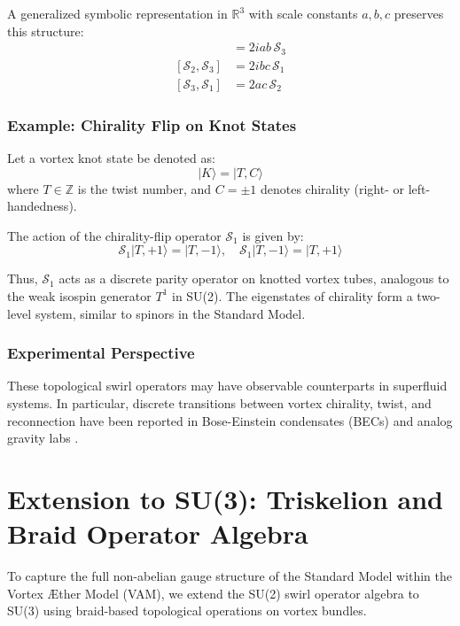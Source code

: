 A generalized symbolic representation in $\mathbb{R}^3$ with scale constants $a, b, c$ preserves this structure:
\begin{align}
[\mathcal{S}_1, \mathcal{S}_2] &= 2iab \, \mathcal{S}_3 \\
[\mathcal{S}_2, \mathcal{S}_3] &= 2ibc \, \mathcal{S}_1 \\
[\mathcal{S}_3, \mathcal{S}_1] &= 2ac \, \mathcal{S}_2
\end{align}

\subsubsection*{Example: Chirality Flip on Knot States}

Let a vortex knot state be denoted as:
\[
|K\rangle = |T, C\rangle
\]
where \( T \in \mathbb{Z} \) is the twist number, and \( C = \pm 1 \) denotes chirality (right- or left-handedness).

The action of the chirality-flip operator \( \mathcal{S}_1 \) is given by:
\[
\mathcal{S}_1 |T, +1\rangle = |T, -1\rangle, \quad
\mathcal{S}_1 |T, -1\rangle = |T, +1\rangle
\]

Thus, \( \mathcal{S}_1 \) acts as a discrete parity operator on knotted vortex tubes, analogous to the weak isospin generator \( T^1 \) in SU(2). The eigenstates of chirality form a two-level system, similar to spinors in the Standard Model.

\subsubsection*{Experimental Perspective}

These topological swirl operators may have observable counterparts in superfluid systems. In particular, discrete transitions between vortex chirality, twist, and reconnection have been reported in Bose-Einstein condensates (BECs) and analog gravity labs \cite{kleckner2013creation, ray2015observation}.

\section{Extension to SU(3): Triskelion and Braid Operator Algebra}

To capture the full non-abelian gauge structure of the Standard Model within the Vortex Æther Model (VAM), we extend the SU(2) swirl operator algebra to SU(3) using braid-based topological operations on vortex bundles.

